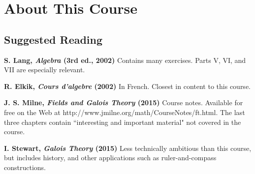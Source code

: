 \section*{About This Course}
\label{sec:AboutThisCourse}

\subsection*{Suggested Reading}
\label{sec:SuggestedReading}

\textbf{S. Lang, \emph{Algebra} (3rd ed., 2002)}
\label{sec:Lang}
Contains many exercises. Parts V, VI, and VII are especially relevant.

\textbf{R. Elkik, \emph{Cours d'algebre} (2002)}
\label{sec:Elkik}
In French. Closest in content to this course.

\textbf{J. S. Milne, \emph{Fields and Galois Theory} (2015)}
\label{sec:Milne}
Course notes. Available for free on the Web at http://www.jmilne.org/math/CourseNotes/ft.html. The last three chapters contain ``interesting and important material" not covered in the course. 

\textbf{I. Stewart, \emph{Galois Theory} (2015)}
\label{sec:Stewart}
Less technically ambitious than this course, but includes history, and other applications such as ruler-and-compass constructions.